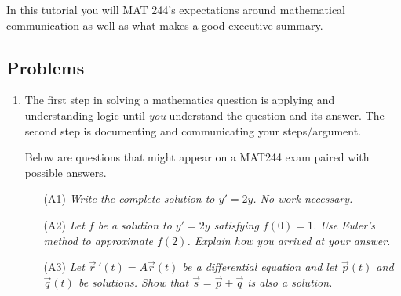\begin{objectives}
	In this tutorial you will MAT 244's expectations around mathematical communication as well
	as what makes a good executive summary.
\end{objectives}

\vspace{-.5em}
\subsection*{Problems}
\vspace{-.5em}


\begin{enumerate}
	\item The first step in solving a mathematics question is applying and understanding logic until \emph{you}
	understand the question and its answer. The second step is documenting and communicating your steps/argument. 
	

	Below are questions that might appear on a MAT244 exam paired with possible answers.

	\begin{enumerate}
		\item[(A1)] \emph{Write the complete solution to $y'=2y$. No work necessary.}


		\item[(A2)] \emph{Let $f$ be a solution to $y'=2y$ satisfying $f(0)=1$. Use Euler's method to approximate $f(2)$. Explain how you arrived at your answer.}
		

		\item[(A3)] \emph{Let $\vec r\,'(t)=A\vec r(t)$ be a differential equation and let $\vec p(t)$ and $\vec q(t)$
		be solutions. Show that $\vec s = \vec p+\vec q$ is also a solution.}


\end{enumerate}
\end{enumerate}
